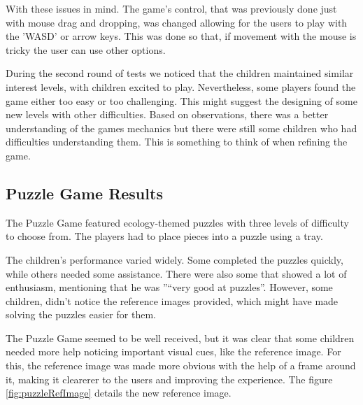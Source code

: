 With these issues in mind. The game's control, that was previously done just with mouse drag and dropping, was changed allowing for the users to play with the 'WASD' or arrow keys. This was done so that, if movement with the mouse is tricky the user can use other options.

During the second round of tests we noticed that the children maintained similar interest levels, with children excited to play. Nevertheless, some players found the game either too easy or too challenging. This might suggest the designing of some new levels with other difficulties. Based on observations, there was a better understanding of the games mechanics but there were still some children who had difficulties understanding them. This is something to think of when refining the game.


\newpage
\subsection{Puzzle Game Results}

The Puzzle Game featured ecology-themed puzzles with three levels of difficulty to choose from. The players had to place pieces into a puzzle using a tray.

The children’s performance varied widely. Some completed the puzzles quickly, while others needed some assistance. There were also some that showed a lot of enthusiasm, mentioning that he was ''“very good at puzzles''. However, some children, didn’t notice the reference images provided, which might have made solving the puzzles easier for them.

The Puzzle Game seemed to be well received, but it was clear that some children needed more help noticing important visual cues, like the reference image. For this, the reference image was made more obvious with the help of a frame around it, making it clearerer to the users and improving the experience. The figure \ref{fig:puzzleRefImage} details the new reference image.

